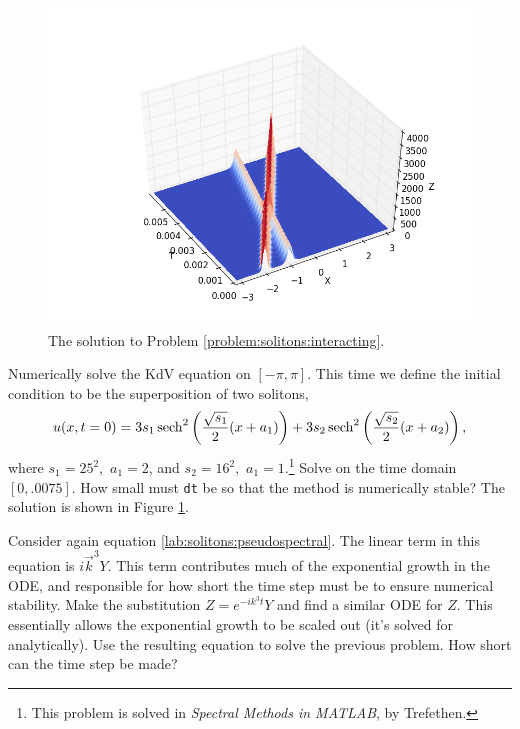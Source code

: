 \begin{figure}
\centering
\includegraphics[width=\textwidth]{interacting_solitons.png}
\caption{The solution to Problem \ref{problem:solitons:interacting}.}
\label{fig:solitons:interacting}
\end{figure}


\begin{problem}
Numerically solve the KdV equation on $[-\pi,\pi]$. This time we define the initial condition 
to be the superposition of two solitons,
\[
u(x,t=0) = 3s_1\operatorname{sech}^2\left(\frac{\sqrt{s_1}}{2}(x+a_1)\right) + 3s_2\operatorname{sech}^2\left(\frac{\sqrt{s_2}}{2}(x+a_2)\right),
\]
where $s_1 = 25^2,$ $a_1 = 2$, and $s_2 = 16^2,$ $a_1 = 1$.\footnote{This problem is solved in \textit{Spectral Methods in MATLAB}, by Trefethen.} Solve on the time domain $[0,.0075]$.  How small must {\tt dt} be so that the method is numerically stable?  The solution is shown in Figure \ref{fig:solitons:interacting}.
\label{problem:solitons:interacting}
\end{problem}







\begin{problem}
	Consider again equation \eqref{lab:solitons:pseudospectral}. The linear term in this equation is 
	$i\vec{k}^3Y$. This term contributes much of the exponential growth in the ODE, and responsible for 
	how short the time step must be to ensure numerical stability. Make the substitution $Z = e^{-ik^3t}Y$ and find a similar ODE for $Z$. This essentially allows the exponential growth to be scaled out (it's solved for analytically). Use the resulting equation to solve the previous problem. How short can the time step be made? 
\end{problem}











